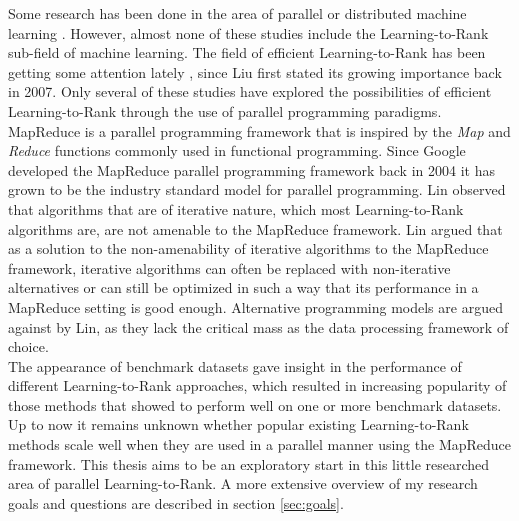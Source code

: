 Some research has been done in the area of parallel or distributed machine learning \cite{Chu2007,Chang2007}. However, almost none of these studies include the Learning-to-Rank sub-field of machine learning. The field of efficient Learning-to-Rank has been getting some attention lately \cite{Asadi2013a,Asadi2013b,Busa-Fekete2012,Sousa2012,Shukla2012}, since Liu \cite{Liu2007} first stated its growing importance back in 2007. Only several of these studies \cite{Sousa2012,Shukla2012} have explored the possibilities of efficient Learning-to-Rank through the use of parallel programming paradigms.\\

MapReduce \cite{Dean2004} is a parallel programming framework that is inspired by the \emph{Map} and \emph{Reduce} functions commonly used in functional programming. Since Google developed the MapReduce parallel programming framework back in 2004 it has grown to be the industry standard model for parallel programming. Lin \cite{Lin2013} observed that algorithms that are of iterative nature, which most Learning-to-Rank algorithms are, are not amenable to the MapReduce framework. Lin argued that as a solution to the non-amenability of iterative algorithms to the MapReduce framework, iterative algorithms can often be replaced with non-iterative alternatives or can still be optimized in such a way that its performance in a MapReduce setting is good enough. Alternative programming models are argued against by Lin, as they lack the critical mass as the data processing framework of choice.\\

The appearance of benchmark datasets gave insight in the performance of different Learning-to-Rank approaches, which resulted in increasing popularity of those methods that showed to perform well on one or more benchmark datasets. Up to now it remains unknown whether popular existing Learning-to-Rank methods scale well when they are used in a parallel manner using the MapReduce framework. This thesis aims to be an exploratory start in this little researched area of parallel Learning-to-Rank. A more extensive overview of my research goals and questions are described in section \ref{sec:goals}.\\

